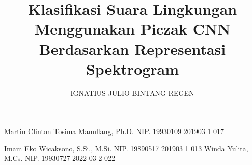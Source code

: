 \documentclass[article]{report} %
\begin{document}

    
    \title{Klasifikasi Suara Lingkungan Menggunakan Piczak CNN Berdasarkan Representasi Spektrogram}

	
    
    \author{IGNATIUS JULIO BINTANG REGEN}		%
	
	\dosbingA%
		{Martin Clinton Tosima Manullang, Ph.D.}%
		{NIP. 19930109 201903 1 017}	%
	
		
	\pengujiA%
		{Imam Eko Wicaksono, S.Si., M.Si.}%
		{NIP. 19890517 201903 1 013}	%
	\pengujiB%
		{Winda Yulita, M.Cs.}%
		{NIP. 19930727 2022 03 2 022}	%

	\sloppy %
    \setcounter{page}{1} %
\end{document}
